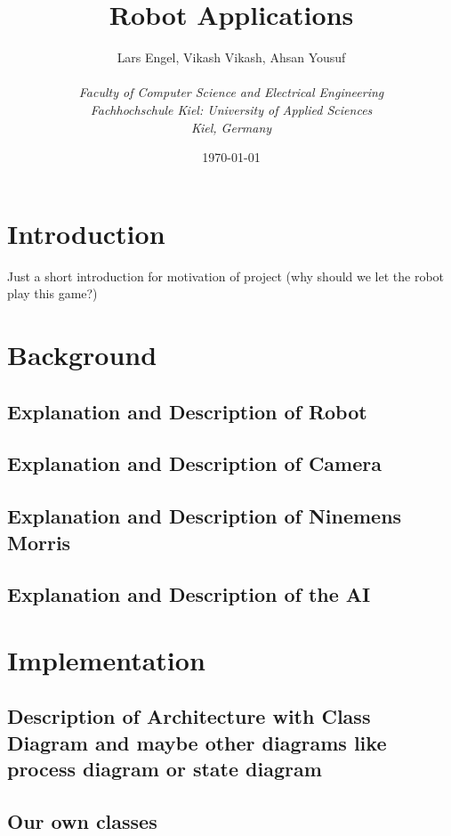 \documentclass[a4paper]{spie}  %
\title{Robot Applications}
\author{Lars Engel, Vikash Vikash, Ahsan Yousuf
\\\textit{\\Faculty of Computer Science and Electrical Engineering
\\Fachhochschule Kiel: University of Applied Sciences\\ Kiel, Germany}
}
\date{\today}
\begin{document}
 
  
  \begin{LARGE}
  \maketitle
  \end{LARGE}
  \vspace{60pt}
  \begin{large}
  \tableofcontents
  \newpage

\pagestyle{plain} 
\setcounter{page}{1}

\section{Introduction}
Just a short introduction for motivation of project (why should we let the robot play this game?)
\section{Background}
\subsection{Explanation and Description of Robot}
\subsection{Explanation and Description of Camera}
\subsection{Explanation and Description of Ninemens Morris}
\subsection{Explanation and Description of the AI}
\section{Implementation}
\subsection{Description of Architecture with Class Diagram and maybe other diagrams like process diagram or state diagram}
\subsection{Our own classes}

\end{large}
\end{document}
